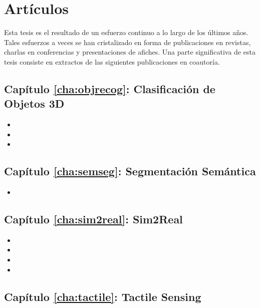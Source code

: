 \section{Artículos}

Esta tesis es el resultado de un esfuerzo continuo a lo largo de los últimos años. Tales esfuerzos a veces se han cristalizado en forma de publicaciones en revistas, charlas en conferencias y presentaciones de afiches. Una parte significativa de esta tesis consiste en extractos de las siguientes publicaciones en coautoría.

\subsection{Capítulo \ref{cha:objrecog}: Clasificación de Objetos 3D}

\begin{itemize}
	\item {}
	\item {}
	\item {}
\end{itemize}

\subsection{Capítulo \ref{cha:semseg}: Segmentación Semántica}

\begin{itemize}
	\item {}
\end{itemize}

\subsection{Capítulo \ref{cha:sim2real}: Sim2Real}

\begin{itemize}
	\item {}
	\item {}
	\item {}
	\item {}
\end{itemize}

\subsection{Capítulo \ref{cha:tactile}: Tactile Sensing}

